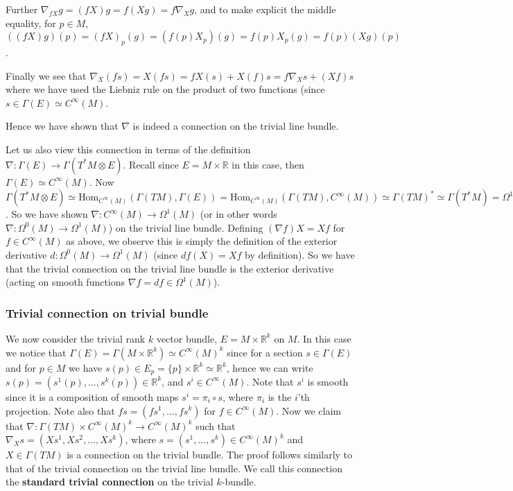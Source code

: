 \documentclass[a4paper]{article}
\theoremstyle{definition} \newtheorem*{definition}{Definition}
\theoremstyle{definition} \newtheorem*{definitions}{Definitions}
\theoremstyle{plain} \newtheorem{theorem}{Theorem}[section]
\theoremstyle{plain} \newtheorem{proposition}[theorem]{Proposition}
\theoremstyle{plain} \newtheorem{corollary}[theorem]{Corollary}
\theoremstyle{plain} \newtheorem{lemma}[theorem]{Lemma}
\theoremstyle{plain} \newtheorem{example}[theorem]{Example}
\newcommand{\defn}[1]{\textbf{#1}}
\newcommand{\realnos}{\mathbb{R}}
\newcommand{\Hom}{\text{Hom}}
\newcommand{\smooth}{C^\infty}
\begin{document}
Further $\nabla_{fX}g=(fX)g=f(Xg)=f\nabla_X g$, and to make explicit the middle equality, for $p\in M$, $((fX)g)(p)=(fX)_p(g)=(f(p)X_p)(g)=f(p)X_p(g)=f(p)(Xg)(p)$.

Finally we see that $\nabla_X(fs)=X(fs)=fX(s)+X(f)s=f\nabla_Xs + (Xf)s$ where we have used the Liebniz rule on the product of two functions (since $s\in \Gamma(E)\simeq \smooth(M)$.

Hence we have shown that $\nabla$ is indeed a connection on the trivial line bundle. 

Let us also view this connection in terms of the definition $\nabla:\Gamma(E)\to \Gamma(T^*M\otimes E)$. Recall since $E=M\times \realnos$ in this case, then $\Gamma(E)\simeq \smooth (M)$. Now $\Gamma(T^*M\otimes E)\simeq \Hom_{\smooth(M)}(\Gamma(TM), \Gamma(E)) = \Hom_{\smooth(M)}(\Gamma(TM), \smooth(M)) \simeq \Gamma(TM)^* \simeq \Gamma(T^*M)=\Omega^1(M)$. So we have shown $\nabla:\smooth(M)\to \Omega^1(M)$ (or in other words $\nabla:\Omega^0(M)\to \Omega^1(M)$) on the trivial line bundle. Defining $(\nabla f)X=Xf$ for $f\in \smooth(M)$ as above, we observe this is simply the definition of the exterior derivative $d:\Omega^0(M)\to \Omega^1(M)$ (since $df(X)=Xf$ by definition). So we have that the trivial connection on the trivial line bundle is the exterior derivative (acting on smooth functions $\nabla f=df \in \Omega^1(M)$). 

\subsubsection{Trivial connection on trivial bundle}
We now consider the trivial rank $k$ vector bundle, $E=M\times \realnos^k$ on $M$. In this case we notice that $\Gamma(E)=\Gamma(M\times \realnos^k)\simeq \smooth (M)^k$ since for a section $s\in \Gamma(E)$ and for $p\in M$ we have $s(p)\in E_p=\{p\}\times \realnos^k\simeq \realnos^k$, hence we can write $s(p)=(s^1(p),\ldots, s^k(p))\in \realnos^k$, and $s^i\in \smooth(M)$. Note that $s^i$ is smooth since it is a composition of smooth maps $s^i=\pi_i\circ s$, where $\pi_i$ is the $i$'th projection. Note also that $fs=(fs^1, \ldots, fs^k)$ for $f\in \smooth(M)$. Now we claim that $\nabla:\Gamma(TM)\times \smooth(M)^k\to \smooth(M)^k$ such that $\nabla_X s = (Xs^1, Xs^2, \ldots, Xs^k)$, where $s=(s^1, \ldots, s^k)\in \smooth (M)^k$ and $X\in \Gamma(TM)$ is a connection on the trivial bundle. The proof follows similarly to that of the trivial connection on the trivial line bundle. We call this connection the \defn{standard trivial connection} on the trivial $k$-bundle. 
\end{document}
